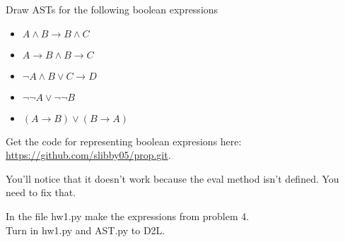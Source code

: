 \documentclass{exam}
\def\land{\wedge}           %
\def\lor{\vee}              %
\def\lnot{\neg}             %
\begin{document}
\begin{questions}
\pagebreak


\question
Draw ASTs for the following boolean expressions
\begin{itemize}
    \item $A \land B \to B \land C$ \vspace{4cm}
    \item $A \to B \land B \to C$ \vspace{4cm}
    \item $\lnot A \land B \lor C \to D$ \vspace{4cm}
    \item $\lnot \lnot A \lor \lnot \lnot B$ \vspace{4cm}
    \item $(A \to B) \lor (B \to A)$ \vspace{4cm}
\end{itemize}


\question

Get the code for representing boolean expresions here:
\url{https://github.com/slibby05/prop.git}.

You'll notice that it doesn't work because the eval method isn't defined.
You need to fix that.

\question

In the file hw1.py make the expressions from problem 4.\\
$\ $\\
Turn in hw1.py and AST.py to D2L.

\end{questions}
\end{document}
